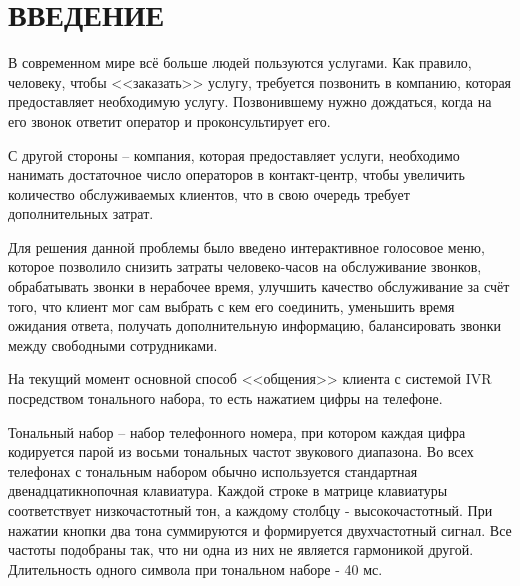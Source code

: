 \chapter{ВВЕДЕНИЕ}

В современном мире всё больше людей пользуются услугами. Как правило,
человеку, чтобы <<заказать>> услугу, требуется позвонить в компанию, которая
предоставляет необходимую услугу. Позвонившему нужно дождаться, когда на его
звонок ответит оператор и проконсультирует его.

С другой стороны -- компания, которая предоставляет услуги, необходимо нанимать
достаточное число операторов в контакт-центр, чтобы увеличить количество
обслуживаемых клиентов, что в свою очередь требует дополнительных затрат.

Для решения данной проблемы было введено интерактивное голосовое меню, которое
позволило снизить затраты человеко-часов на обслуживание звонков,
обрабатывать звонки в нерабочее время, улучшить качество обслуживание за счёт того,
что клиент мог сам выбрать с кем его соединить, уменьшить время ожидания ответа,
получать дополнительную информацию, балансировать звонки между свободными сотрудниками.

На текущий момент основной способ <<общения>> клиента с системой IVR посредством
тонального набора, то есть нажатием цифры на телефоне.

Тональный набор -- набор телефонного номера, при котором каждая цифра кодируется
парой из восьми тональных частот звукового диапазона. Во всех телефонах с
тональным набором обычно используется стандартная двенадцатикнопочная клавиатура.
Каждой строке в матрице клавиатуры соответствует низкочастотный тон, а каждому
столбцу - высокочастотный. При нажатии кнопки два тона суммируются и формируется
двухчастотный сигнал. Все частоты подобраны так, что ни одна из них не является
гармоникой другой. Длительность одного символа при тональном наборе - 40 мс.~\cite{dtmf}
